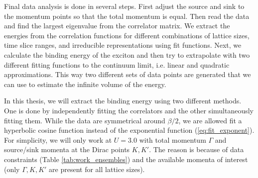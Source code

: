 
Final data analysis is done in several steps. First adjust the source and sink to the momentum points so that the total momentum is equal. Then read the data and find the largest eigenvalue from the correlator matrix. We extract the energies from the correlation functions for different combinations of lattice sizes, time slice ranges, and irreducible representations using fit functions. Next, we calculate the binding energy of the exciton and then try to extrapolate with two different fitting functions to the continuum limit, i.e. linear and quadratic approximations. This way two different sets of data points are generated that we can use to estimate the infinite volume of the energy.

In this thesis, we will extract the binding energy using two different methods. One is done by independently fitting the correlators and the other simultaneously fitting them. While the data are symmetrical around $\beta/2$, we are allowed fit a hyperbolic cosine function instead of the exponential function (\ref{eq:fit_exponent}). For simplicity, we will only work at $U = 3.0$ with total momentum $\Gamma$ and source/sink momenta at the Dirac points $K, K'$. The reason is because of data constraints (Table \ref{tab:work_ensembles}) and the available momenta of interest (only $\Gamma, K, K'$ are present for all lattice sizes).

